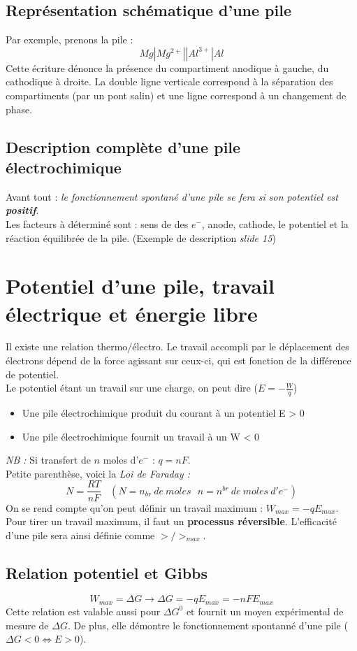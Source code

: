 \documentclass	[11pt, a4paper, openany]{book}
\begin{document}
\subsection{Représentation schématique d'une pile}
Par exemple, prenons la pile :
$$Mg | Mg^{2+} || Al^{3+} | Al$$
Cette écriture dénonce la présence du compartiment anodique à gauche, du cathodique à droite. La double ligne verticale correspond à la séparation des compartiments (par un pont salin) et une ligne correspond à un changement de phase.

\subsection{Description complète d'une pile électrochimique}
Avant tout : \textit{le fonctionnement spontané d'une pile se fera si son potentiel est \textbf{positif}}.\\
Les facteurs à déterminé sont : sens de des $e^-$, anode, cathode, le potentiel et la réaction équilibrée de la pile. (Exemple de description \textit{slide 15})

\section{Potentiel d'une pile, travail électrique et énergie libre}
Il existe une relation thermo/électro. Le travail accompli par le déplacement des électrons dépend de la force agissant sur ceux-ci, qui est fonction de la différence de potentiel.\\
Le potentiel étant un travail sur une charge, on peut dire ($E = -\frac{W}{q}$)
\begin{itemize}
	\item Une pile électrochimique produit du courant à un potentiel E > 0
	\item Une pile électrochimique fournit un travail à un W < 0
\end{itemize}
\textit{NB :} Si transfert de $n$ moles d'$e^-$ : $q = nF$.\\

Petite parenthèse, voici la \textit{Loi de Faraday :}
$$N = \frac{RT}{nF}\ \ \ \ (N = n_{br}\ de\ moles\ \ \ n = n^{br}\ de\ moles\ d'e^-)$$
On se rend compte qu'on peut définir un travail maximum : $W_{max} = -qE_{max}$. Pour tirer un travail maximum, il faut un \textbf{processus réversible}. L'efficacité d'une pile sera ainsi définie comme $>/>_{max}$.
\subsection*{Relation potentiel et Gibbs}
$$W_{max} = \Delta G \rightarrow \Delta G = -qE_{max} = -nFE_{max}$$
Cette relation est valable aussi pour $\Delta G^0$ et fournit un moyen expérimental de mesure de $\Delta G$. De plus, elle démontre le fonctionnement spontanné d'une pile ($\Delta G <0 \Leftrightarrow E > 0$).
\end{document}
